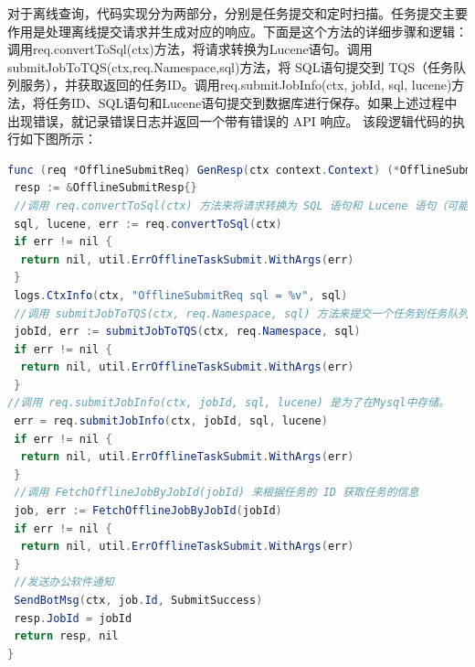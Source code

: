 \begin{longtable}[htbp]
对于离线查询，代码实现分为两部分，分别是任务提交和定时扫描。任务提交主要作用是处理离线提交请求并生成对应的响应。下面是这个方法的详细步骤和逻辑：调用req.convertToSql(ctx)方法，将请求转换为Lucene语句。调用submitJobToTQS(ctx,req.Namespace,sql)方法，将 SQL语句提交到 TQS（任务队列服务），并获取返回的任务ID。调用req.submitJobInfo(ctx, jobId, sql, lucene)方法，将任务ID、SQL语句和Lucene语句提交到数据库进行保存。如果上述过程中出现错误，就记录错误日志并返回一个带有错误的 API 响应。
该段逻辑代码的执行如下图所示：

\begin{lrbox}{\offlineSearchchulicode}  
\begin{lstlisting}[language=Java]  
func (req *OfflineSubmitReq) GenResp(ctx context.Context) (*OfflineSubmitResp, util.APIError) {
 resp := &OfflineSubmitResp{}
 //调用 req.convertToSql(ctx) 方法来将请求转换为 SQL 语句和 Lucene 语句（可能是用于某种搜索或索引）。
 sql, lucene, err := req.convertToSql(ctx)
 if err != nil {
  return nil, util.ErrOfflineTaskSubmit.WithArgs(err)
 }
 logs.CtxInfo(ctx, "OfflineSubmitReq sql = %v", sql)
 //调用 submitJobToTQS(ctx, req.Namespace, sql) 方法来提交一个任务到任务队列.
 jobId, err := submitJobToTQS(ctx, req.Namespace, sql)
 if err != nil {
  return nil, util.ErrOfflineTaskSubmit.WithArgs(err)
 }
//调用 req.submitJobInfo(ctx, jobId, sql, lucene) 是为了在Mysql中存储。
 err = req.submitJobInfo(ctx, jobId, sql, lucene)
 if err != nil {
  return nil, util.ErrOfflineTaskSubmit.WithArgs(err)
 }
 //调用 FetchOfflineJobByJobId(jobId) 来根据任务的 ID 获取任务的信息
 job, err := FetchOfflineJobByJobId(jobId)
 if err != nil {
  return nil, util.ErrOfflineTaskSubmit.WithArgs(err)
 }
 //发送办公软件通知
 SendBotMsg(ctx, job.Id, SubmitSuccess)
 resp.JobId = jobId
 return resp, nil
}
\end{lstlisting}  
\end{lrbox} 
\begin{table}[h]   
\caption{离线查询提交关键逻辑}  
\label{tab:offlineSearchchulicode}  
\usebox{\offlineSearchchulicode}  
\end{table}  


\end{longtable}

